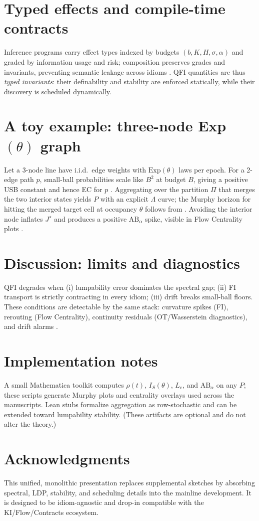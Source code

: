 \documentclass[11pt]{article}
\theoremstyle{plain}
\theoremstyle{definition}
\theoremstyle{remark}
\newcommand{\1}{\mathbbm{1}}
\begin{document}
\section{Typed effects and compile-time contracts}\label{sec:types}
Inference programs carry effect types indexed by budgets \((b,K,H,\sigma,\alpha)\) and graded by information usage and risk; composition preserves grades and invariants, preventing semantic leakage across idioms \parencite{elliott2025graded,elliott2025contracts}. QFI quantities are thus \emph{typed invariants}: their definability and stability are enforced statically, while their discovery is scheduled dynamically.

\section{A toy example: three-node Exp\((\theta)\) graph}\label{sec:toy}
Let a 3-node line have i.i.d.\ edge weights with \(\mathrm{Exp}(\theta)\) laws per epoch. For a 2-edge path \(p\), small-ball probabilities scale like \(B^2\) at budget \(B\), giving a positive USB constant and hence EC for \(p\) \parencite{elliott2025drift}. Aggregating over the partition \(\Pi\) that merges the two interior states yields \(P\) with an explicit \(\Lambda\) curve; the Murphy horizon for hitting the merged target cell at occupancy \(\theta\) follows from . Avoiding the interior node inflates \(J^\star\) and produces a positive \(\mathrm{AB}_\alpha\) spike, visible in Flow Centrality plots \parencite{elliott2025flow}.

\section{Discussion: limits and diagnostics}
QFI degrades when (i) lumpability error dominates the spectral gap; (ii) FI transport is strictly contracting in every idiom; (iii) drift breaks small-ball floors. These conditions are detectable by the same stack: curvature spikes (FI), rerouting (Flow Centrality), continuity residuals (OT/Wasserstein diagnostics), and drift alarms \parencite{elliott2025ki,elliott2025flow,elliott2025drift,Villani2009}.

\section{Implementation notes}
A small Mathematica toolkit computes \(\rho(t)\), \(I_S(\theta)\), \(L_c\), and \(\mathrm{AB}_\alpha\) on any \(P\); these scripts generate Murphy plots and centrality overlays used across the manuscripts. Lean stubs formalize aggregation as row-stochastic and can be extended toward lumpability stability. (These artifacts are optional and do not alter the theory.)

\section*{Acknowledgments}
This unified, monolithic presentation replaces supplemental sketches by absorbing spectral, LDP, stability, and scheduling details into the mainline development. It is designed to be idiom-agnostic and drop-in compatible with the KI/Flow/Contracts ecosystem.

\printbibliography
\end{document}
